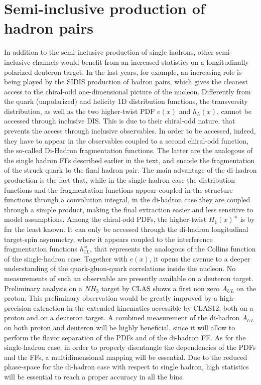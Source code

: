 \documentclass[a4paper,12pt]{report}
\begin{document}
\section{Semi-inclusive production of hadron pairs}
In addition to the semi-inclusive production of single hadrons, other semi-inclusive channels would benefit from an increased statistics on a longitudinally polarized deuteron target. 
In the last years, for example, an increasing role is being played by the SIDIS production of hadron pairs, which gives the cleanest access to the chiral-odd one-dimensional picture of the nucleon. Differently from the quark (unpolarized) and helicity 1D distribution functions, the transversity distribution, as well as the two higher-twist PDF $e(x)$ and $h_L(x)$, cannot be accessed through inclusive DIS. This is due to their chiral-odd nature, that prevents the access through inclusive observables. In order to be accessed, indeed, they have to appear in the observables coupled to a second chiral-odd function, the so-called Di-Hadron fragmentation functions. The latter are the analogous of the single hadron FFs described earlier in the text, and encode the fragmentation of the struck quark to the final hadron pair. 
The main advantage of the di-hadron production is the fact that, while in the single-hadron case the distribution functions and the fragmentation functions appear coupled in the structure functions through a convolution integral, in the di-hadron case they are coupled through a simple product, making the final extraction easier and less sensitive to model assumptions. 
Among the chiral-odd PDFs, the higher-twist $H_1(x)^\sphericalangle$ is by far the least known. It can only be accessed through the di-hadron longitudinal target-spin asymmetry, where it appears coupled to the interference fragmentation functions $h_{1L}^\sphericalangle$, that represents the analogous of the Collins function of the single-hadron case. 
Together with $e(x)$, it opens the avenue to a deeper understanding of the quark-gluon-quark correlations inside the nucleon. No measurements of such an observable are presently available on a deuteron target. Preliminary analysis on a $NH_3$ target by CLAS shows a first non zero $A_{UL}$ on the proton. This preliminary observation would be greatly improved by a high-precision extraction in the extended kinematics accessible by CLAS12, both on a proton and on a deuteron target. A combined measurement of the di-hadron $A_{UL}$ on both proton and deuteron will be highly beneficial, since it will allow to perform the flavor separation of the PDFs and of the di-hadron FF. As for the single-hadron case, in order to properly disentangle the dependencies of the PDFs and the FFs, a multidimensional mapping will be essential. Due to the reduced phase-space for the di-hadron case with respect to single hadron, high statistics will be essential to reach a proper accuracy in all the bins. 
\end{document}
